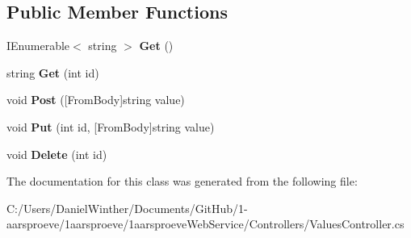 \subsection*{Public Member Functions}
\begin{DoxyCompactItemize}
\item 
\hypertarget{class__1aarsproeve_web_service_1_1_controllers_1_1_values_controller_a6aabdf6d41689230f8c9ac16bd6e0cf2}{}I\+Enumerable$<$ string $>$ {\bfseries Get} ()\label{class__1aarsproeve_web_service_1_1_controllers_1_1_values_controller_a6aabdf6d41689230f8c9ac16bd6e0cf2}

\item 
\hypertarget{class__1aarsproeve_web_service_1_1_controllers_1_1_values_controller_a23709bd2085124a4a9523ee83f3f2458}{}string {\bfseries Get} (int id)\label{class__1aarsproeve_web_service_1_1_controllers_1_1_values_controller_a23709bd2085124a4a9523ee83f3f2458}

\item 
\hypertarget{class__1aarsproeve_web_service_1_1_controllers_1_1_values_controller_a67e206660305cb8c2e3245c6cbe137d2}{}void {\bfseries Post} (\mbox{[}From\+Body\mbox{]}string value)\label{class__1aarsproeve_web_service_1_1_controllers_1_1_values_controller_a67e206660305cb8c2e3245c6cbe137d2}

\item 
\hypertarget{class__1aarsproeve_web_service_1_1_controllers_1_1_values_controller_a050db0929ea30dc0e8ad7a296ba7f348}{}void {\bfseries Put} (int id, \mbox{[}From\+Body\mbox{]}string value)\label{class__1aarsproeve_web_service_1_1_controllers_1_1_values_controller_a050db0929ea30dc0e8ad7a296ba7f348}

\item 
\hypertarget{class__1aarsproeve_web_service_1_1_controllers_1_1_values_controller_aea45aefd356d052c838878691e7fb645}{}void {\bfseries Delete} (int id)\label{class__1aarsproeve_web_service_1_1_controllers_1_1_values_controller_aea45aefd356d052c838878691e7fb645}

\end{DoxyCompactItemize}


The documentation for this class was generated from the following file\+:\begin{DoxyCompactItemize}
\item 
C\+:/\+Users/\+Daniel\+Winther/\+Documents/\+Git\+Hub/1-\/aarsproeve/1aarsproeve/1aarsproeve\+Web\+Service/\+Controllers/Values\+Controller.\+cs\end{DoxyCompactItemize}
